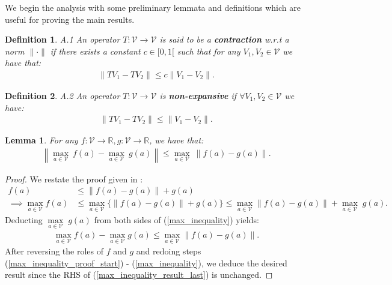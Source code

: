 \documentclass[12pt]{article}
\newtheorem{proof}{Proof}
\newtheorem{definition}{Definition}
\newtheorem{lemma}{Lemma}
\begin{document}
\clearpage
We begin the analysis with some preliminary lemmata and definitions which are useful for proving the main results.

\begin{definition}{A.1}
An operator $T: \mathcal{V}\to \mathcal{V}$ is said to be a \textbf{contraction} w.r.t a norm $\|\cdot\|$ if there exists a constant $c\in[0,1[$ such that for any $V_1,V_2\in  \mathcal{V}$ we have that:
\begin{align}
    \|TV_1-TV_2\|\leq c\|V_1-V_2\|.
\end{align}
\end{definition}

\begin{definition}{A.2}
An operator $T: \mathcal{V}\to  \mathcal{V}$ is \textbf{non-expansive} if $\forall V_1,V_2\in  \mathcal{V}$ we have:
\begin{align}
    \|TV_1-TV_2\|\leq \|V_1-V_2\|.
\end{align}
\end{definition}




\begin{lemma} \label{max_lemma}
For any
$f: \mathcal{V}\to\mathbb{R},g: \mathcal{V}\to\mathbb{R}$, we have that:
\begin{align}
\left\|\underset{a\in \mathcal{V}}{\max}\:f(a)-\underset{a\in \mathcal{V}}{\max}\: g(a)\right\| \leq \underset{a\in \mathcal{V}}{\max}\: \left\|f(a)-g(a)\right\|.    \label{lemma_1_basic_max_ineq}
\end{align}
\end{lemma}
\begin{proof}
We restate the proof given in \cite{mguni2019cutting}:
\begin{align}
f(a)&\leq \left\|f(a)-g(a)\right\|+g(a)\label{max_inequality_proof_start}
\\\implies
\underset{a\in \mathcal{V}}{\max}f(a)&\leq \underset{a\in \mathcal{V}}{\max}\{\left\|f(a)-g(a)\right\|+g(a)\}
\leq \underset{a\in \mathcal{V}}{\max}\left\|f(a)-g(a)\right\|+\underset{a\in \mathcal{V}}{\max}\;g(a). \label{max_inequality}
\end{align}
Deducting $\underset{a\in \mathcal{V}}{\max}\;g(a)$ from both sides of (\ref{max_inequality}) yields:
\begin{align}
    \underset{a\in \mathcal{V}}{\max}f(a)-\underset{a\in \mathcal{V}}{\max}g(a)\leq \underset{a\in \mathcal{V}}{\max}\left\|f(a)-g(a)\right\|.\label{max_inequality_result_last}
\end{align}
After reversing the roles of $f$ and $g$ and redoing steps (\ref{max_inequality_proof_start}) - (\ref{max_inequality}), we deduce the desired result since the RHS of (\ref{max_inequality_result_last}) is unchanged.
\end{proof}
\end{document}
